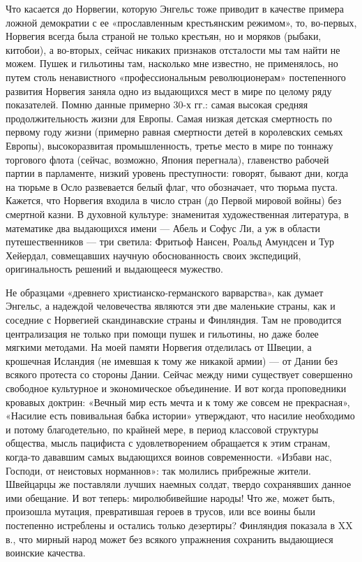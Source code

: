 Что касается  до Норвегии,  которую Энгельс  тоже приводит  в качестве
примера ложной  демократии с ее «прославленным  крестьянским режимом»,
то,  во-первых,  Норвегия  всегда  была страной  не  только  крестьян,
но  и   моряков  (рыбаки,   китобои),  а  во-вторых,   сейчас  никаких
признаков  отсталости  мы  там  найти  не  можем.  Пушек  и  гильотины
там,  насколько   мне  известно,   не  применялось,  но   путем  столь
ненавистного  «профессиональным революционерам»  постепенного развития
Норвегия  заняла  одно  из  выдающихся  мест в  мире  по  целому  ряду
показателей.  Помню данные  примерно 30-х  гг.: самая  высокая средняя
продолжительность жизни для Европы. Самая низкая детская смертность по
первому  году жизни  (примерно равная  смертности детей  в королевских
семьях  Европы), высокоразвитая  промышленность, третье  место в  мире
по  тоннажу  торгового  флота (сейчас,  возможно,  Япония  перегнала),
главенство рабочей  партии в парламенте, низкий  уровень преступности:
говорят, бывают  дни, когда на  тюрьме в Осло развевается  белый флаг,
что  обозначает, что  тюрьма пуста.  Кажется, что  Норвегия входила  в
число стран (до  Первой мировой войны) без смертной  казни. В духовной
культуре:  знаменитая  художественная  литература,  в  математике  два
выдающихся имени --- Абель и Софус Ли, а уж в области путешественников
---  три светила:  Фритьоф  Нансен, Роальд  Амундсен  и Тур  Хейердал,
совмещавших  научную обоснованность  своих экспедиций,  оригинальность
решений и выдающееся мужество.

Не образцами «древнего христианско-германского варварства», как думает
Энгельс, а  надеждой человечества  являются эти две  маленькие страны,
как и  соседние с Норвегией  скандинавские страны и Финляндия.  Там не
проводится централизация  не только при  помощи пушек и  гильотины, но
даже  более  мягкими  методами.  На моей  памяти  Норвегия  отделилась
от  Швеции,  а  крошечная  Исландия  (не имевшая  к  тому  же  никакой
армии)  --- от  Дании без  всякого протеста  со стороны  Дании. Сейчас
между ними существует совершенно  свободное культурное и экономическое
объединение.  И  вот  когда  проповедники  кровавых  доктрин:  «Вечный
мир  есть мечта  и  к тому  же совсем  не  прекрасная», «Насилие  есть
повивальная бабка истории» утверждают, что насилие необходимо и потому
благодетельно, по крайней мере, в период классовой структуры общества,
мысль пацифиста с удовлетворением  обращается к этим странам, когда-то
дававшим самых выдающихся воинов  современности. «Избави нас, Господи,
от неистовых норманнов»: так  молились прибрежные жители. Швейцарцы же
поставляли  лучших  наемных  солдат,  твердо  сохранявших  данное  ими
обещание. И  вот теперь:  миролюбивейшие народы!  Что же,  может быть,
произошла мутация,  превратившая героев в  трусов, или все  воины были
постепенно истреблены и остались  только дезертиры? Финляндия показала
в  XX в.,  что мирный  народ  может без  всякого упражнения  сохранить
выдающиеся воинские качества.

